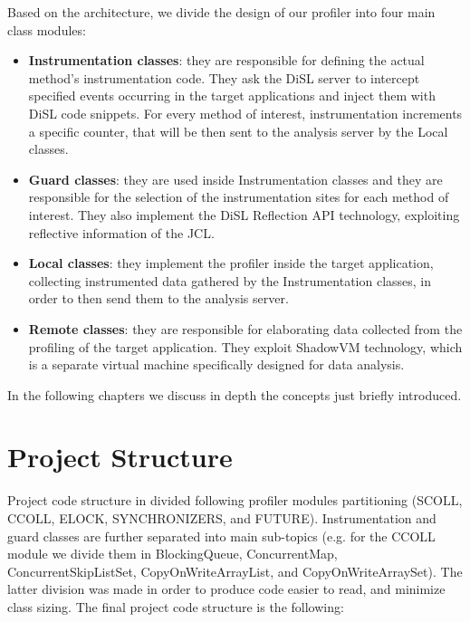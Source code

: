 \documentclass[]{usiinfthesis}
\begin{document}
\noindent
Based on the architecture, we divide the design of our profiler into four main class modules:
\begin{itemize}
    \item \textbf{Instrumentation classes}: they are responsible for defining the actual method's instrumentation code. They ask  the DiSL server to intercept specified events occurring in the target applications and inject them with DiSL code snippets. For every method of interest, instrumentation increments a specific counter, that will be then sent to the analysis server by the Local classes.
    \item \textbf{Guard classes}: they are used inside Instrumentation classes and they are responsible for the selection of the instrumentation sites for each method of interest. They also implement the DiSL Reflection API technology, exploiting reflective information of the JCL.
    \item \textbf{Local classes}: they implement the profiler inside the target application, collecting instrumented data gathered by the Instrumentation classes, in order to then send them to the analysis server.
    \item \textbf{Remote classes}: they are responsible for elaborating data collected from the profiling of the target application. They exploit ShadowVM technology, which is a separate virtual machine specifically designed for data analysis.
\end{itemize}
In the following chapters we discuss in depth the concepts just briefly introduced. 


\section{Project Structure}
Project code structure in divided following profiler modules partitioning (SCOLL, CCOLL, ELOCK, SYNCHRONIZERS, and FUTURE). Instrumentation and guard classes are further separated into main sub-topics (e.g. for the CCOLL module we divide them in BlockingQueue, ConcurrentMap, ConcurrentSkipListSet, CopyOnWriteArrayList, and CopyOnWriteArraySet). The latter division was made in order to produce code easier to read, and minimize class sizing. The final project code structure is the following:
\end{document}
